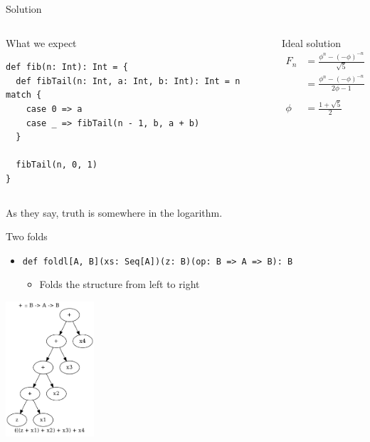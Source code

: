 \documentclass[presentation,aspectratio=169,smaller]{beamer}
\begin{document}
\begin{frame}[label={sec:orgcd67a90},fragile]{Solution}
 \begin{columns}
\begin{column}[t]{0.5\columnwidth}
\begin{block}{What we expect}
\begin{verbatim}
def fib(n: Int): Int = {
  def fibTail(n: Int, a: Int, b: Int): Int = n match {
    case 0 => a
    case _ => fibTail(n - 1, b, a + b)
  }

  fibTail(n, 0, 1)
}
\end{verbatim}

\pause
\end{block}
\end{column}

\begin{column}[t]{0.5\columnwidth}
\begin{block}{Ideal solution}
\begin{align*}
  F_n &= \frac {\phi ^ n - {(- \phi)}^{-n}} {\sqrt{5}} \\
  &= \frac {\phi ^ n - {(- \phi)}^{-n}} {2\phi - 1} \\
  \\
  \phi &= \frac {1 + \sqrt{5}}{2}
\end{align*}

\pause
\end{block}
\end{column}
\end{columns}

As they say, truth is somewhere in the logarithm.
\end{frame}

\begin{frame}[label={sec:orge114a9e},fragile]{Two folds}
 \begin{itemize}
\item \texttt{def foldl[A, B](xs: Seq[A])(z: B)(op: B => A => B): B}
\begin{itemize}
\item Folds the structure from left to right
\end{itemize}
\end{itemize}

\pause

\begin{center}
\includegraphics[height=5cm]{.dot/foldl-1.png}
\end{center}
\end{frame}
\end{document}
